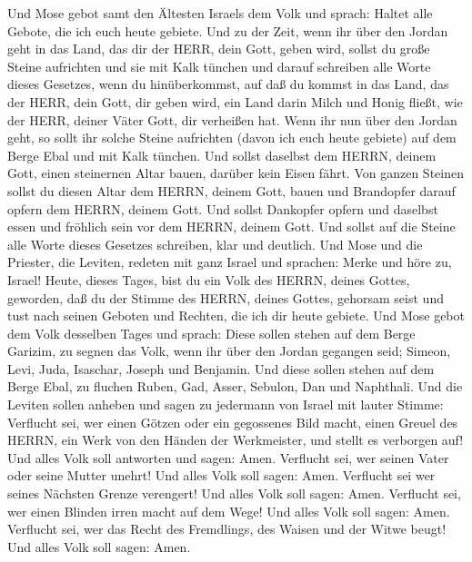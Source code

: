  Und Mose gebot samt den Ältesten Israels dem Volk und
sprach: Haltet alle Gebote, die ich euch heute gebiete.  Und
zu der Zeit, wenn ihr über den Jordan geht in das Land, das dir der
HERR, dein Gott, geben wird, sollst du große Steine aufrichten und sie
mit Kalk tünchen  und darauf schreiben alle Worte dieses
Gesetzes, wenn du hinüberkommst, auf daß du kommst in das Land, das der
HERR, dein Gott, dir geben wird, ein Land darin Milch und Honig fließt,
wie der HERR, deiner Väter Gott, dir verheißen hat.  Wenn
ihr nun über den Jordan geht, so sollt ihr solche Steine aufrichten
(davon ich euch heute gebiete) auf dem Berge Ebal und mit Kalk tünchen.
 Und sollst daselbst dem HERRN, deinem Gott, einen
steinernen Altar bauen, darüber kein Eisen fährt.  Von
ganzen Steinen sollst du diesen Altar dem HERRN, deinem Gott, bauen und
Brandopfer darauf opfern dem HERRN, deinem Gott.  Und sollst
Dankopfer opfern und daselbst essen und fröhlich sein vor dem HERRN,
deinem Gott.  Und sollst auf die Steine alle Worte dieses
Gesetzes schreiben, klar und deutlich.  Und Mose und die
Priester, die Leviten, redeten mit ganz Israel und sprachen: Merke und
höre zu, Israel! Heute, dieses Tages, bist du ein Volk des HERRN, deines
Gottes, geworden,  daß du der Stimme des HERRN, deines
Gottes, gehorsam seist und tust nach seinen Geboten und Rechten, die ich
dir heute gebiete.  Und Mose gebot dem Volk desselben Tages
und sprach:  Diese sollen stehen auf dem Berge Garizim, zu
segnen das Volk, wenn ihr über den Jordan gegangen seid; Simeon, Levi,
Juda, Isaschar, Joseph und Benjamin.  Und diese sollen
stehen auf dem Berge Ebal, zu fluchen Ruben, Gad, Asser, Sebulon, Dan
und Naphthali.  Und die Leviten sollen anheben und sagen zu
jedermann von Israel mit lauter Stimme:  Verflucht sei, wer
einen Götzen oder ein gegossenes Bild macht, einen Greuel des HERRN, ein
Werk von den Händen der Werkmeister, und stellt es verborgen auf! Und
alles Volk soll antworten und sagen: Amen.  Verflucht sei,
wer seinen Vater oder seine Mutter unehrt! Und alles Volk soll sagen:
Amen.  Verflucht sei wer seines Nächsten Grenze verengert!
Und alles Volk soll sagen: Amen.  Verflucht sei, wer einen
Blinden irren macht auf dem Wege! Und alles Volk soll sagen: Amen.
 Verflucht sei, wer das Recht des Fremdlings, des Waisen
und der Witwe beugt! Und alles Volk soll sagen: Amen. 
